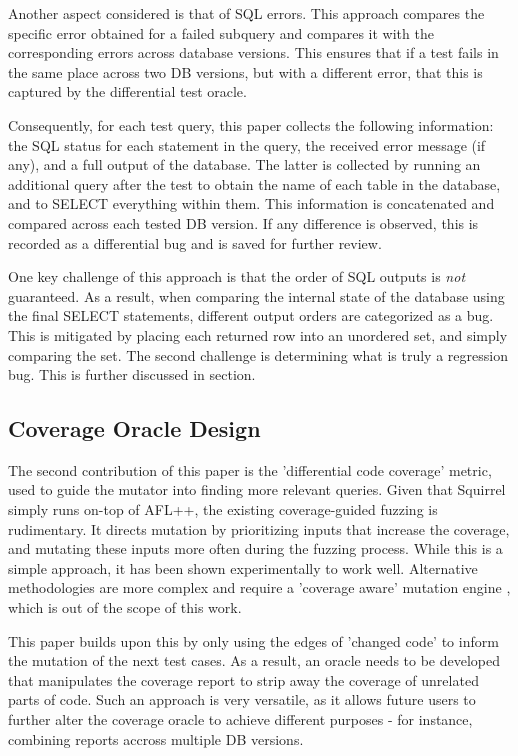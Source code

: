 \documentclass[sigconf]{acmart}
\begin{document}
Another aspect considered is that of SQL errors. This approach compares the specific error obtained for a failed subquery and compares it with the corresponding errors across database versions. This ensures that if a test fails in the same place across two DB versions, but with a different error, that this is captured by the differential test oracle.

Consequently, for each test query, this paper collects the following information: the SQL status for each statement in the query, the received error message (if any), and a full output of the database. The latter is collected by running an additional query after the test to obtain the name of each table in the database, and to SELECT everything within them. This information is concatenated and compared  across each tested DB version. If any difference is observed, this is recorded as a differential bug and is saved for further review.

One key challenge of this approach is that the order of SQL outputs is \textit{not} guaranteed. As a result, when comparing the internal state of the database using the final SELECT statements, different output orders are categorized as a bug. This is mitigated by placing each returned row into an unordered set, and simply comparing the set. The second challenge is determining what is truly a regression bug. This is further discussed in section.

\subsection{Coverage Oracle Design}
The second contribution of this paper is the 'differential code coverage' metric, used to guide the mutator into finding more relevant queries. Given that Squirrel simply runs on-top of AFL++, the existing coverage-guided fuzzing is rudimentary. It directs mutation by prioritizing inputs that increase the coverage, and mutating these inputs more often during the fuzzing process. While this is a simple approach, it has been shown experimentally to work well. Alternative methodologies are more complex and require a 'coverage aware' mutation engine , which is out of the scope of this work.

This paper builds upon this by only using the edges of 'changed code' to inform the mutation of the next test cases. As a result, an oracle needs to be developed that manipulates the coverage report to strip away the coverage of unrelated parts of code. Such an approach is very versatile, as it allows future users to further alter the coverage oracle to achieve different purposes - for instance, combining reports accross multiple DB versions.
\end{document}
